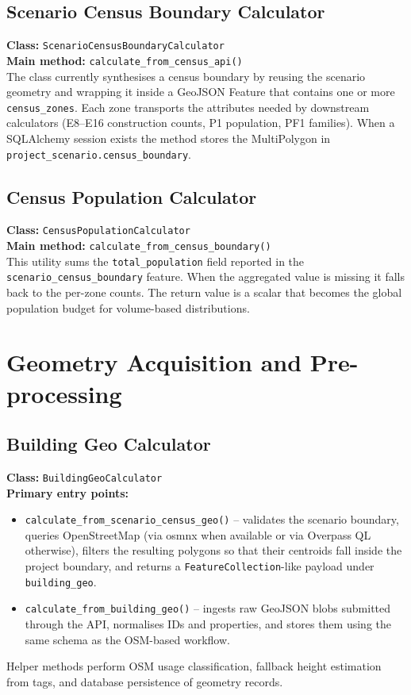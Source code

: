 \subsection{Scenario Census Boundary Calculator}
\textbf{Class:} \texttt{ScenarioCensusBoundaryCalculator}\\
\textbf{Main method:} \texttt{calculate\_from\_census\_api()}\\
The class currently synthesises a census boundary by reusing the
scenario geometry and wrapping it inside a GeoJSON Feature that contains
one or more \texttt{census\_zones}. Each zone transports the attributes
needed by downstream calculators (E8–E16 construction counts, P1
population, PF1 families). When a SQLAlchemy session exists the method
stores the MultiPolygon in \texttt{project\_scenario.census\_boundary}.

\subsection{Census Population Calculator}
\textbf{Class:} \texttt{CensusPopulationCalculator}\\
\textbf{Main method:} \texttt{calculate\_from\_census\_boundary()}\\
This utility sums the \texttt{total\_population} field reported in
the \texttt{scenario\_census\_boundary} feature. When the aggregated
value is missing it falls back to the per-zone counts. The return value
is a scalar that becomes the global population budget for volume-based
distributions.

\section{Geometry Acquisition and Pre-processing}
\subsection{Building Geo Calculator}
\textbf{Class:} \texttt{BuildingGeoCalculator}\\
\textbf{Primary entry points:}
\begin{itemize}[leftmargin=2em]
    \item \texttt{calculate\_from\_scenario\_census\_geo()} – validates the
    scenario boundary, queries OpenStreetMap (via osmnx when available or
    via Overpass QL otherwise), filters the resulting polygons so that their
    centroids fall inside the project boundary, and returns a
    \texttt{FeatureCollection}-like payload under \texttt{building\_geo}.
    \item \texttt{calculate\_from\_building\_geo()} – ingests raw GeoJSON
    blobs submitted through the API, normalises IDs and properties, and
    stores them using the same schema as the OSM-based workflow.
\end{itemize}
Helper methods perform OSM usage classification, fallback height
estimation from tags, and database persistence of geometry records.

